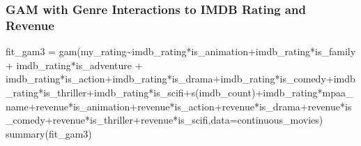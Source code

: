 \documentclass[
]{article}
\newenvironment{Shaded}{\begin{snugshade}}{\end{snugshade}}
\newcommand{\AttributeTok}[1]{\textcolor[rgb]{0.77,0.63,0.00}{#1}}
\newcommand{\FunctionTok}[1]{\textcolor[rgb]{0.00,0.00,0.00}{#1}}
\newcommand{\NormalTok}[1]{#1}
\newcommand{\OtherTok}[1]{\textcolor[rgb]{0.56,0.35,0.01}{#1}}
\newcommand{\SpecialCharTok}[1]{\textcolor[rgb]{0.00,0.00,0.00}{#1}}
\begin{document}
\hypertarget{gam-with-genre-interactions-to-imdb-rating-and-revenue}{%
\subsubsection{GAM with Genre Interactions to IMDB Rating and
Revenue}\label{gam-with-genre-interactions-to-imdb-rating-and-revenue}}

\begin{Shaded}
\begin{Highlighting}[]
\NormalTok{fit\_gam3 }\OtherTok{=} \FunctionTok{gam}\NormalTok{(my\_rating}\SpecialCharTok{\textasciitilde{}}\NormalTok{imdb\_rating}\SpecialCharTok{*}\NormalTok{is\_animation}\SpecialCharTok{+}\NormalTok{imdb\_rating}\SpecialCharTok{*}\NormalTok{is\_family }\SpecialCharTok{+}\NormalTok{ imdb\_rating}\SpecialCharTok{*}\NormalTok{is\_adventure }\SpecialCharTok{+}\NormalTok{ imdb\_rating}\SpecialCharTok{*}\NormalTok{is\_action}\SpecialCharTok{+}\NormalTok{imdb\_rating}\SpecialCharTok{*}\NormalTok{is\_drama}\SpecialCharTok{+}\NormalTok{imdb\_rating}\SpecialCharTok{*}\NormalTok{is\_comedy}\SpecialCharTok{+}\NormalTok{imdb\_rating}\SpecialCharTok{*}\NormalTok{is\_thriller}\SpecialCharTok{+}\NormalTok{imdb\_rating}\SpecialCharTok{*}\NormalTok{is\_scifi}\SpecialCharTok{+}\FunctionTok{s}\NormalTok{(imdb\_count)}\SpecialCharTok{+}\NormalTok{imdb\_rating}\SpecialCharTok{*}\NormalTok{mpaa\_name}\SpecialCharTok{+}\NormalTok{revenue}\SpecialCharTok{*}\NormalTok{is\_animation}\SpecialCharTok{+}\NormalTok{revenue}\SpecialCharTok{*}\NormalTok{is\_action}\SpecialCharTok{+}\NormalTok{revenue}\SpecialCharTok{*}\NormalTok{is\_drama}\SpecialCharTok{+}\NormalTok{revenue}\SpecialCharTok{*}\NormalTok{is\_comedy}\SpecialCharTok{+}\NormalTok{revenue}\SpecialCharTok{*}\NormalTok{is\_thriller}\SpecialCharTok{+}\NormalTok{revenue}\SpecialCharTok{*}\NormalTok{is\_scifi,}\AttributeTok{data=}\NormalTok{continuous\_movies)}
\FunctionTok{summary}\NormalTok{(fit\_gam3)}
\end{Highlighting}
\end{Shaded}
\end{document}
